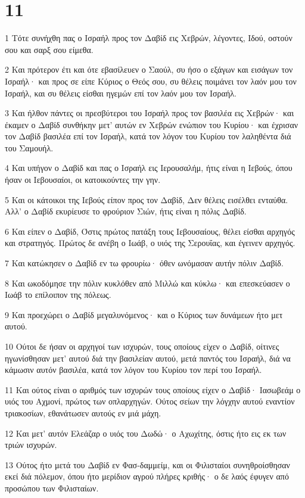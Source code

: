 \chapter{11}

\par 1 Τότε συνήχθη πας ο Ισραήλ προς τον Δαβίδ εις Χεβρών, λέγοντες, Ιδού, οστούν σου και σαρξ σου είμεθα.
\par 2 Και πρότερον έτι και ότε εβασίλευεν ο Σαούλ, συ ήσο ο εξάγων και εισάγων τον Ισραήλ· και προς σε είπε Κύριος ο Θεός σου, συ θέλεις ποιμάνει τον λαόν μου τον Ισραήλ, και συ θέλεις είσθαι ηγεμών επί τον λαόν μου τον Ισραήλ.
\par 3 Και ήλθον πάντες οι πρεσβύτεροι του Ισραήλ προς τον βασιλέα εις Χεβρών· και έκαμεν ο Δαβίδ συνθήκην μετ' αυτών εν Χεβρών ενώπιον του Κυρίου· και έχρισαν τον Δαβίδ βασιλέα επί τον Ισραήλ, κατά τον λόγον του Κυρίου τον λαληθέντα διά του Σαμουήλ.
\par 4 Και υπήγον ο Δαβίδ και πας ο Ισραήλ εις Ιερουσαλήμ, ήτις είναι η Ιεβούς, όπου ήσαν οι Ιεβουσαίοι, οι κατοικούντες την γην.
\par 5 Και οι κάτοικοι της Ιεβούς είπον προς τον Δαβίδ, Δεν θέλεις εισέλθει ενταύθα. Αλλ' ο Δαβίδ εκυρίευσε το φρούριον Σιών, ήτις είναι η πόλις Δαβίδ.
\par 6 Και είπεν ο Δαβίδ, Όστις πρώτος πατάξη τους Ιεβουσαίους, θέλει είσθαι αρχηγός και στρατηγός. Πρώτος δε ανέβη ο Ιωάβ, ο υιός της Σερουΐας, και έγεινεν αρχηγός.
\par 7 Και κατώκησεν ο Δαβίδ εν τω φρουρίω· όθεν ωνόμασαν αυτήν πόλιν Δαβίδ.
\par 8 Και ωκοδόμησε την πόλιν κυκλόθεν από Μιλλώ και κύκλω· και επεσκεύασεν ο Ιωάβ το επίλοιπον της πόλεως.
\par 9 Και προεχώρει ο Δαβίδ μεγαλυνόμενος· και ο Κύριος των δυνάμεων ήτο μετ αυτού.
\par 10 Ούτοι δε ήσαν οι αρχηγοί των ισχυρών, τους οποίους είχεν ο Δαβίδ, οίτινες ηγωνίσθησαν μετ' αυτού διά την βασιλείαν αυτού, μετά παντός του Ισραήλ, διά να κάμωσιν αυτόν βασιλέα, κατά τον λόγον του Κυρίου τον περί του Ισραήλ.
\par 11 Και ούτος είναι ο αριθμός των ισχυρών τους οποίους είχεν ο Δαβίδ· Ιασωβεάμ ο υιός του Αχμονί, πρώτος των οπλαρχηγών. Ούτος σείων την λόγχην αυτού εναντίον τριακοσίων, εθανάτωσεν αυτούς εν μιά μάχη.
\par 12 Και μετ' αυτόν Ελεάζαρ ο υιός του Δωδώ· ο Αχωχίτης, όστις ήτο εις εκ των τριών ισχυρών.
\par 13 Ούτος ήτο μετά του Δαβίδ εν Φασ-δαμμείμ, και οι Φιλισταίοι συνηθροίσθησαν εκεί διά πόλεμον, όπου ήτο μερίδιον αγρού πλήρες κριθής· ο δε λαός έφυγεν από προσώπου των Φιλισταίων.
